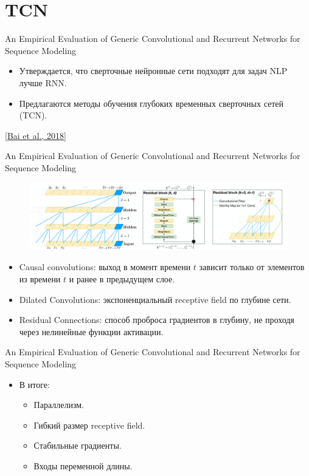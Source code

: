 \section{TCN}
\begin{frame}[c]{An Empirical Evaluation of Generic Convolutional and Recurrent Networks for Sequence Modeling}
\begin{itemize}
	[square]
	\item Утверждается, что сверточные нейронные сети подходят для задач NLP лучше RNN.
	\item Предлагаются методы обучения глубоких временных сверточных сетей (TCN).
\end{itemize}
\let\thefootnote\footnote{\href{http://arxiv.org/abs/1803.01271}{\color[rgb]{0.5,0.5,0.5} [Bai et al., 2018]}}
\end{frame}

\begin{frame}[c]{An Empirical Evaluation of Generic Convolutional and Recurrent Networks for Sequence Modeling}
\begin{figure}
	\centering
	\includegraphics[width=1.0\textwidth]{figures/tcn.png}
\end{figure}
\begin{itemize}
	[square]
	\item Causal convolutions: выход в момент времени $t$ зависит только от элементов из времени $t$ и ранее в предыдущем слое.
	\item Dilated Convolutions: экспоненциальный receptive field по глубине сети. 
	\item Residual Connections: способ проброса градиентов в глубину, не проходя через нелинейные функции активации.
\end{itemize}
\end{frame}

\begin{frame}[c]{An Empirical Evaluation of Generic Convolutional and Recurrent Networks for Sequence Modeling}
\begin{itemize}
	[square]
	\item В итоге:
	\begin{itemize}
		[circle]
		\item Параллелизм. 
		\item Гибкий размер receptive field.
		\item Стабильные градиенты.
		\item Входы переменной длины.
	\end{itemize}
\end{itemize}
\end{frame}

